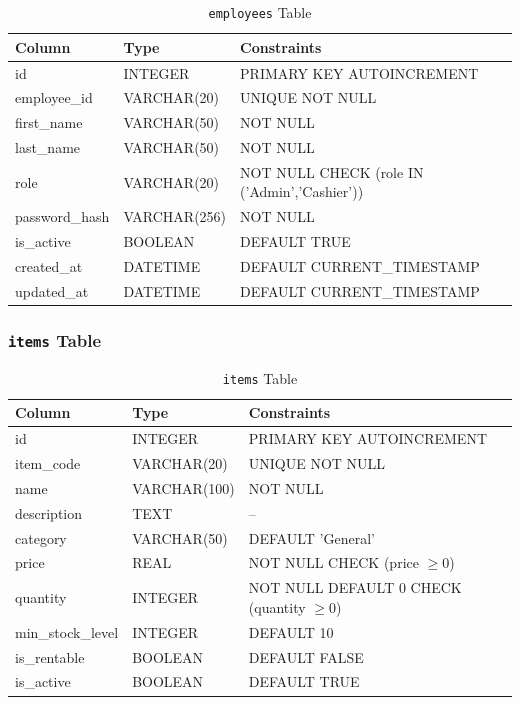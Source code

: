 \begin{table}[h]
  \centering
  \caption{\texttt{employees} Table}
  \begin{tabular}{p{3cm} p{3cm} p{6cm}}
    \toprule
    \textbf{Column} & \textbf{Type} & \textbf{Constraints} \\
    \midrule
    id            & INTEGER        & PRIMARY KEY AUTOINCREMENT \\
    employee\_id  & VARCHAR(20)    & UNIQUE NOT NULL \\
    first\_name   & VARCHAR(50)    & NOT NULL \\
    last\_name    & VARCHAR(50)    & NOT NULL \\
    role          & VARCHAR(20)    & NOT NULL CHECK (role IN ('Admin','Cashier')) \\
    password\_hash & VARCHAR(256)  & NOT NULL \\
    is\_active    & BOOLEAN        & DEFAULT TRUE \\
    created\_at   & DATETIME       & DEFAULT CURRENT\_TIMESTAMP \\
    updated\_at   & DATETIME       & DEFAULT CURRENT\_TIMESTAMP \\
    \bottomrule
  \end{tabular}
\end{table}

\subsubsection*{\texttt{items} Table}

\begin{table}[h]
  \centering
  \caption{\texttt{items} Table}
  \begin{tabular}{p{3cm} p{3cm} p{6cm}}
    \toprule
    \textbf{Column} & \textbf{Type} & \textbf{Constraints} \\
    \midrule
    id              & INTEGER     & PRIMARY KEY AUTOINCREMENT \\
    item\_code      & VARCHAR(20) & UNIQUE NOT NULL \\
    name            & VARCHAR(100) & NOT NULL \\
    description     & TEXT        & -- \\
    category        & VARCHAR(50) & DEFAULT 'General' \\
    price           & REAL        & NOT NULL CHECK (price $\geq 0$) \\
    quantity        & INTEGER     & NOT NULL DEFAULT 0 CHECK (quantity $\geq 0$) \\
    min\_stock\_level & INTEGER   & DEFAULT 10 \\
    is\_rentable    & BOOLEAN     & DEFAULT FALSE \\
    is\_active      & BOOLEAN     & DEFAULT TRUE \\
    \bottomrule
  \end{tabular}
\end{table}

